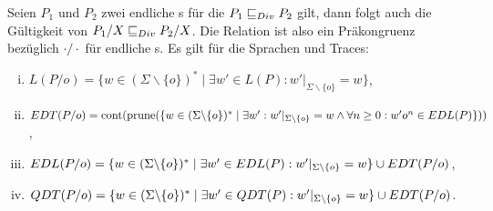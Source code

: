 \begin{Satz}
  \label{DivHidingSatz}
  Seien $P_1$ und $P_2$ zwei endliche \MEIO{}s für die $P_1 \sqsubseteq  _{Div} P_2$ gilt,
  dann folgt auch die Gültigkeit von $P_1/X \sqsubseteq  _{Div} P_2/X$. Die Relation \DRel{}
  ist also ein Präkongruenz bezüglich $\cdot /\cdot$ für endliche \MEIO{}s. Es
  gilt für die Sprachen und Traces:
  \begin{enumerate}[(i)]
    \item $L(P/o) = \{w\in (\Sigma\backslash \{o\})^*\mid \exists w'\in L(P):
      w'|_{\Sigma\backslash \{o\}} = w\}$,
    \item $EDT (P/o) = \mathrm{cont} (\mathrm{prune} (\{w\in (\Sigma\backslash \{o\})^*\mid
      \exists w':w'|_{\Sigma\backslash \{o\}} = w\land \forall n\geq 0:
      w'o^n\in EDL (P)\}))$,
    \item $EDL (P/o) = \{w\in (\Sigma\backslash \{o\})^*\mid \exists w'\in
      EDL(P): w'|_{\Sigma\backslash \{o\}} = w\} \cup EDT (P/o)$,
    \item $QDT (P/o) = \{w\in (\Sigma\backslash \{o\})^*\mid \exists w'\in
      QDT(P): w'|_{\Sigma\backslash \{o\}} = w\} \cup EDT (P/o)$.
  \end{enumerate}
\end{Satz}
